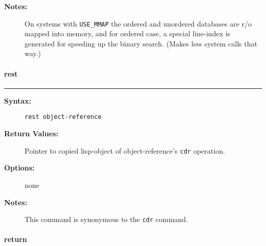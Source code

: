 \begin{description}
\begin{description}
\end{description}


\item[{\bf Notes:}] \mbox{}

On systems with {\tt USE\_MMAP} the ordered 
and unordered databases are r/o mapped into memory, and for ordered 
case, a special line-index is generated for speeding up the binary 
search. (Makes less system calls that way.)

\end{description}


\vspace {2pt}


\paragraph{rest}

\hrule
\begin{description}
\item[{\bf Syntax:}] \mbox{}

{\tt rest object-reference}

\item[{\bf Return Values:}] \mbox{}

Pointer to copied lisp-object of 
object-reference's {\tt cdr} operation.

\item[{\bf Options:}] \mbox{}

none  

\item[{\bf Notes:}] \mbox{}

This command is synonymous to the {\tt cdr}
command.

\end{description}


\vspace {2pt}


\paragraph{return}

